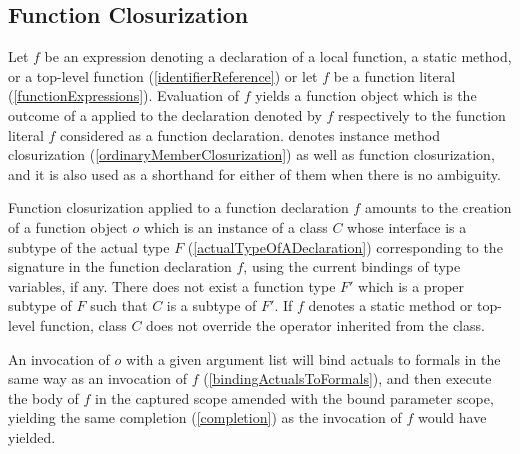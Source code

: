 \documentclass[makeidx]{article}
\begin{document}
\subsection{Function Closurization}

\LMHash{}%
Let $f$ be an expression denoting
a declaration of a local function, a static method, or a top-level function
(\ref{identifierReference})
or let $f$ be a function literal
(\ref{functionExpressions}).
Evaluation of $f$ yields a function object
which is the outcome of a 
applied to the declaration denoted by $f$
respectively to the function literal $f$ considered as a function declaration.
denotes instance method closurization
(\ref{ordinaryMemberClosurization})
as well as function closurization,
and it is also used as a shorthand for either of them when there is no ambiguity.

\LMHash{}%
Function closurization applied to a function declaration $f$
amounts to the creation of a function object $o$
which is an instance of a class $C$ whose interface is
a subtype of the actual type $F$
(\ref{actualTypeOfADeclaration})
corresponding to the signature in the function declaration $f$,
using the current bindings of type variables, if any.
There does not exist a function type $F'$ which is a proper subtype of $F$
such that $C$ is a subtype of $F'$.
If $f$ denotes a static method or top-level function,
class $C$ does not override the \code{==} operator
inherited from the  class.


\LMHash{}%
An invocation of $o$ with a given argument list will bind actuals to formals
in the same way as an invocation of $f$
(\ref{bindingActualsToFormals}),
and then execute the body of $f$
in the captured scope amended with the bound parameter scope,
yielding the same completion
(\ref{completion})
as the invocation of $f$ would have yielded.
\end{document}
